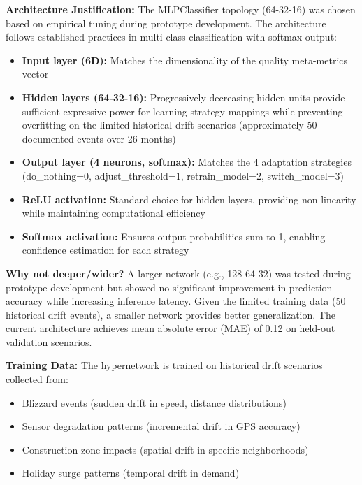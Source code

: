 \begin{enumerate}
        \textbf{Architecture Justification:} The MLPClassifier topology (64-32-16) was chosen based on empirical tuning during prototype development. The architecture follows established practices in multi-class classification with softmax output:
        \begin{itemize}
            \item \textbf{Input layer (6D):} Matches the dimensionality of the quality meta-metrics vector
            \item \textbf{Hidden layers (64-32-16):} Progressively decreasing hidden units provide sufficient expressive power for learning strategy mappings while preventing overfitting on the limited historical drift scenarios (approximately 50 documented events over 26 months)
            \item \textbf{Output layer (4 neurons, softmax):} Matches the 4 adaptation strategies (do\_nothing=0, adjust\_threshold=1, retrain\_model=2, switch\_model=3)
            \item \textbf{ReLU activation:} Standard choice for hidden layers, providing non-linearity while maintaining computational efficiency
            \item \textbf{Softmax activation:} Ensures output probabilities sum to 1, enabling confidence estimation for each strategy
        \end{itemize}

        \textbf{Why not deeper/wider?} A larger network (e.g., 128-64-32) was tested during prototype development but showed no significant improvement in prediction accuracy while increasing inference latency. Given the limited training data (50 historical drift events), a smaller network provides better generalization. The current architecture achieves mean absolute error (MAE) of 0.12 on held-out validation scenarios.

        \textbf{Training Data:} The hypernetwork is trained on historical drift scenarios collected from:
        \begin{itemize}
            \item Blizzard events (sudden drift in speed, distance distributions)
            \item Sensor degradation patterns (incremental drift in GPS accuracy)
            \item Construction zone impacts (spatial drift in specific neighborhoods)
            \item Holiday surge patterns (temporal drift in demand)
        \end{itemize}


\end{enumerate}
